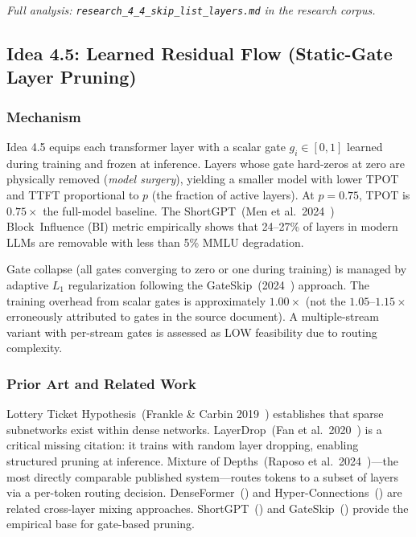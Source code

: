 \documentclass[11pt]{article}
\begin{document}
\par\noindent\textit{Full analysis: \texttt{research\_4\_4\_skip\_list\_layers.md} in the research corpus.}


\subsection{Idea 4.5: Learned Residual Flow (Static-Gate Layer Pruning)}
\label{subsec:idea45}

\subsubsection*{Mechanism}

Idea 4.5 equips each transformer layer with a scalar gate $g_i \in [0, 1]$ learned during training and frozen at inference. Layers whose gate hard-zeros at zero are physically removed (\emph{model surgery}), yielding a smaller model with lower TPOT and TTFT proportional to $p$ (the fraction of active layers). At $p{=}0.75$, TPOT is $0.75\times$ the full-model baseline. The ShortGPT~(Men et al.\ 2024~\cite{MenShortGPT2024}) Block~Influence (BI) metric empirically shows that 24--27\% of layers in modern LLMs are removable with less than 5\% MMLU degradation.

Gate collapse (all gates converging to zero or one during training) is managed by adaptive $L_1$ regularization following the GateSkip~(2024~\cite{GateSkip2024}) approach. The training overhead from scalar gates is approximately $1.00\times$ (not the $1.05$--$1.15\times$ erroneously attributed to gates in the source document). A multiple-stream variant with per-stream gates is assessed as LOW feasibility due to routing complexity.

\subsubsection*{Prior Art and Related Work}

Lottery Ticket Hypothesis~(Frankle \& Carbin 2019~\cite{FrankleCarbin2019}) establishes that sparse subnetworks exist within dense networks. LayerDrop~(Fan et al.\ 2020~\cite{FanLayerDrop2020}) is a critical missing citation: it trains with random layer dropping, enabling structured pruning at inference. Mixture of Depths~(Raposo et al.\ 2024~\cite{RaposoMoD2024})---the most directly comparable published system---routes tokens to a subset of layers via a per-token routing decision. DenseFormer~(\cite{Pagliardini2024DenseFormer}) and Hyper-Connections~(\cite{SunHyperConnections2024}) are related cross-layer mixing approaches. ShortGPT~(\cite{MenShortGPT2024}) and GateSkip~(\cite{GateSkip2024}) provide the empirical base for gate-based pruning.
\end{document}
